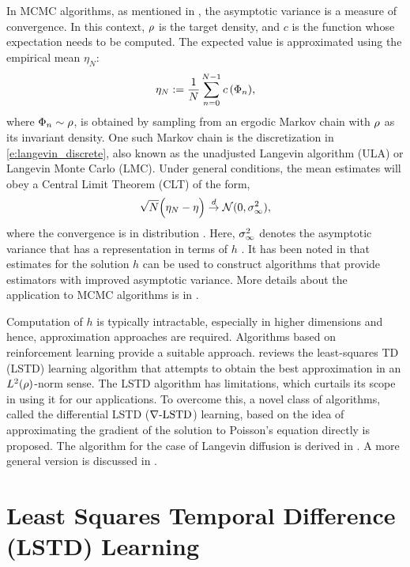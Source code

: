 In MCMC algorithms, as mentioned in , the asymptotic variance is a measure of convergence. In this context, $\rho$ is the target density, and $c$ is the function whose expectation needs to be computed. The expected value is approximated using the empirical mean $\eta_N$:
\begin{equation} \eta_N := \frac{1}{N} \sum_{n=0}^{N-1} c\,(\Phi_n),\end{equation}
where $\Phi_n \sim \rho$, is obtained by sampling from an ergodic Markov chain with $\rho$ as its invariant density. One such Markov chain is the discretization in \eqref{e:langevin_discrete}, also known as the unadjusted Langevin algorithm (ULA) or Langevin Monte Carlo (LMC). Under general conditions, the mean estimates will obey a Central Limit Theorem (CLT) of the form,
\begin{equation}
\sqrt{N} \Bigl( \eta_N - \eta \Bigr) \overset{d}{\to} \mathcal{N}(0,\sigma_\infty ^2),
\end{equation}
where the convergence is in distribution \cite{MT,bha82}. Here, $\sigma_\infty^2$ denotes the asymptotic variance that has a representation in terms of $h$ \cite{glymey96a,MT,asmgly07}. It has been noted in \cite{henthesis97, delkon12} that estimates for the solution $h$ can be used to construct algorithms that provide estimators with improved asymptotic variance. More details about the application to MCMC algorithms is in . 

Computation of $h$ is typically intractable, especially in higher dimensions and hence, approximation approaches are required. Algorithms based on reinforcement learning provide a suitable approach.  reviews the least-squares TD (LSTD) learning algorithm that attempts to obtain the best approximation in an $L^2(\rho)$-norm sense. The LSTD algorithm has limitations, which curtails its scope in using it for our applications. To overcome this, a novel class of algorithms, called the differential LSTD ($\nabla\text{-LSTD}$) learning, based on the idea of approximating the gradient of the solution to Poisson's equation directly is proposed. The algorithm for the case of Langevin diffusion is derived in .  A more general version is discussed in . 

\section{Least Squares Temporal Difference (LSTD) Learning} 
\label{s:lstd}
